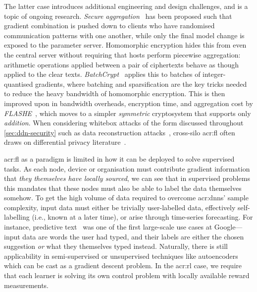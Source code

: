 The latter case introduces additional engineering and design challenges, and is a topic of ongoing research.
\emph{Secure aggregation}~\parencite{DBLP:conf/ccs/BonawitzIKMMPRS17} has been proposed such that gradient combination is pushed down to clients who have randomised communication patterns with one another, while only the final model change is exposed to the parameter server.
Homomorphic encryption hides this from even the central server without requiring that hosts perform piecewise aggregation: arithmetic operations applied between a pair of ciphertexts behave as though applied to the clear texts.
\emph{BatchCrypt}~\parencite{DBLP:conf/usenix/ZhangLX00020} applies this to batches of integer-quantised gradients, where batching and sparsification are the key tricks needed to reduce the heavy bandwidth of homomorphic encryption.
This is then improved upon in bandwidth overheads, encryption time, and aggregation cost by \emph{FLASHE}~\parencite{DBLP:journals/corr/abs-2109-00675}, which moves to a simpler \emph{symmetric} cryptosystem that supports only \emph{addition}.
When considering whitebox attacks of the form discussed throughout \cref{sec:ddn-security} such as data reconstruction attacks~\parencite{DBLP:conf/icml/LamW0RM21}, cross-silo \gls{acr:fl} often draws on differential privacy literature~\parencite{DBLP:conf/iclr/McMahanRT018}.



\gls{acr:fl} as a paradigm is limited in how it can be deployed to solve supervised tasks.
As each node, device or organisation must contribute gradient information that \emph{they themselves have locally sourced}, we can see that in supervised problems this mandates that these nodes must also be able to label the data themselves somehow.
To get the high volume of data required to overcome \glspl{acr:dnn}' sample complexity, input data must either be trivially user-labelled data, effectively self-labelling (i.e., known at a later time), or arise through time-series forecasting.
For instance, predictive text~\parencite{federated-learning-blog} was one of the first large-scale use cases at Google---input data are words the user had typed, and their labels are either the chosen suggestion \emph{or} what they themselves typed instead.
Naturally, there is still applicability in semi-supervised or unsupervised techniques like autoencoders~\parencite{DBLP:journals/ftml/KingmaW19} which can be cast as a gradient descent problem.
In the \gls{acr:rl} case, we require that each learner is solving its own control problem with locally available reward measurements.

